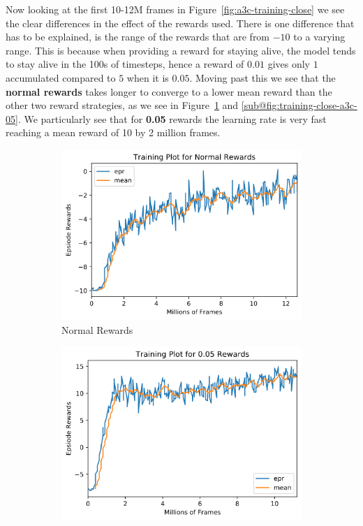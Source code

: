 Now looking at the first 10-12M frames in Figure~\ref{fig:a3c-training-close} we see the clear differences in the effect of the rewards used. There is one difference that has to be explained, is the range of the rewards that are from $-10$ to a varying range. This is because when providing a reward for staying alive, the model tends to stay alive in the 100s of timesteps, hence a reward of $0.01$ gives only $1$ accumulated compared to $5$ when it is $0.05$. Moving past this we see that the \textbf{normal rewards} takes longer to converge to a lower mean reward than the other two reward strategies, as we see in Figure~\ref{fig:training-close-a3c-normal} and \ref{sub@fig:training-close-a3c-05}. We particularly see that for \textbf{0.05} rewards the learning rate is very fast reaching a mean reward of 10 by 2 million frames. 
\begin{figure}[ht!]
    \centering
    \begin{subfigure}{0.49\textwidth}
        \centering
        \includegraphics[width=\textwidth]{figures/a3c-training-normal_close.png}
        \caption{Normal Rewards}
        \label{fig:training-close-a3c-normal}
    \end{subfigure}
    \begin{subfigure}{0.49\textwidth}
        \centering
        \includegraphics[width=\textwidth]{figures/a3c-training-0-05_close.png}

\end{subfigure}
\end{figure}

